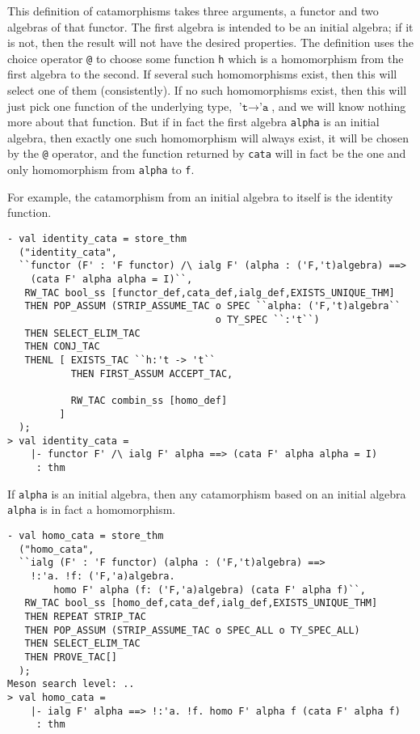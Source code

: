 This definition of catamorphisms takes three arguments, a functor and two algebras of that
functor. The first algebra is intended to be an initial algebra; if it is not, then the
result will not have the desired properties. The definition uses the \HOLW{} choice
operator \texttt{@} to choose some function \texttt{h} which is a homomorphism from
the first algebra to the second. If several such homomorphisms exist, then this will
select one of them (consistently). If no such homomorphisms exist, then this will just
pick one function of the underlying type, $\texttt{'t} \rightarrow \texttt{'a}$,
and we will know nothing more about that function.
But if in fact the first algebra \texttt{alpha} is an initial algebra, then exactly
one such homomorphism will always exist, it will be chosen by the \texttt{@} operator,
and the function returned by \texttt{cata} will in fact be the one and only homomorphism from
\texttt{alpha} to \texttt{f}.

For example, the catamorphism from an initial algebra to itself is the identity function.
\begin{session}
\begin{verbatim}
- val identity_cata = store_thm
  ("identity_cata",
  ``functor (F' : 'F functor) /\ ialg F' (alpha : ('F,'t)algebra) ==>
    (cata F' alpha alpha = I)``,
   RW_TAC bool_ss [functor_def,cata_def,ialg_def,EXISTS_UNIQUE_THM]
   THEN POP_ASSUM (STRIP_ASSUME_TAC o SPEC ``alpha: ('F,'t)algebra``
                                    o TY_SPEC ``:'t``)
   THEN SELECT_ELIM_TAC
   THEN CONJ_TAC
   THENL [ EXISTS_TAC ``h:'t -> 't``
           THEN FIRST_ASSUM ACCEPT_TAC,

           RW_TAC combin_ss [homo_def]
         ]
  );
> val identity_cata =
    |- functor F' /\ ialg F' alpha ==> (cata F' alpha alpha = I)
     : thm
\end{verbatim}
\end{session}

\newpage
If \texttt{alpha} is an initial algebra, then any catamorphism based on an
initial algebra \texttt{alpha} is in fact a homomorphism.
\begin{session}
\begin{verbatim}
- val homo_cata = store_thm
  ("homo_cata",
  ``ialg (F' : 'F functor) (alpha : ('F,'t)algebra) ==>
    !:'a. !f: ('F,'a)algebra.
        homo F' alpha (f: ('F,'a)algebra) (cata F' alpha f)``,
   RW_TAC bool_ss [homo_def,cata_def,ialg_def,EXISTS_UNIQUE_THM]
   THEN REPEAT STRIP_TAC
   THEN POP_ASSUM (STRIP_ASSUME_TAC o SPEC_ALL o TY_SPEC_ALL)
   THEN SELECT_ELIM_TAC
   THEN PROVE_TAC[]
  );
Meson search level: ..
> val homo_cata =
    |- ialg F' alpha ==> !:'a. !f. homo F' alpha f (cata F' alpha f)
     : thm
\end{verbatim}
\end{session}

